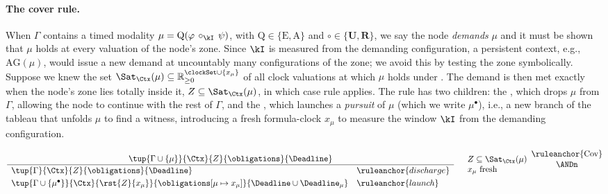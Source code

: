 \paragraph{The cover rule.}
When $\Gamma$ contains a timed modality $\mu=\mathrm{Q}(\varphi\,\circ_\kI\,\psi)$, with
$\mathrm{Q}\in\{\mathrm{E},\mathrm{A}\}$ and $\circ\in\{\mathbf{U},\mathbf{R}\}$, we say the node
\emph{demands} $\mu$ and it must be shown that $\mu$ holds at every
valuation of the node's zone. Since $\kI$ is measured from the demanding configuration, a persistent
context, e.g., $\mathrm{AG}(\mu)$, would issue a new demand at uncountably many configurations of the
zone; we avoid this by testing the zone symbolically. Suppose we knew the set $\Sat_{\Ctx}(\mu) \subseteq \mathbb{R}_{\ge0}^{\clockSet\cup\{x_\mu\}}$ of all clock valuations at which $\mu$ holds under \Ctx. The demand is then met exactly when the node's zone lies totally inside it, $Z\subseteq\Sat_{\Ctx}(\mu)$, in which case rule  applies. The rule has two children: the , which drops $\mu$ from $\Gamma$, allowing the node to continue with the rest of $\Gamma$, and the , which launches a \emph{pursuit} of $\mu$ (which we write $\mu^\bullet$), i.e., a new branch of the tableau that unfolds $\mu$ to find a witness, introducing a fresh formula-clock $x_\mu$ to measure the window $\kI$ from the demanding configuration. 









%
\vspace{-0.3cm}
\[
\frac{\tup{\Gamma\cup\{\mu\}}{\Ctx}{Z}{\obligations}{\Deadline}}
{\begin{array}{ll}
\tup{\Gamma}{\Ctx}{Z}{\obligations}{\Deadline} & \ruleanchor{discharge}\\[3pt]
\tup{\Gamma\cup\{\mu^\bullet\}}{\Ctx}{\rst{Z}{x_\mu}}{\obligations[\mu\mapsto x_\mu]}{\Deadline\cup \Deadline_\mu}
 & \ruleanchor{launch}
\end{array}}
\quad
\begin{array}{l}
Z\subseteq\Sat_{\Ctx}(\mu)\\
x_\mu \text{ fresh}
\end{array}
\shortstack{\ruleanchor{Cov}\\\ANDn}
\]

